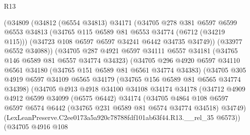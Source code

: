 \begin{lexlean}{R13}
\begin{coremodule}
                    (@34809
                      (@34812
                        (@6554 @34813)
                        @34171
                        (@34705
                          @278
                          @381
                          @6597
                          @6599
                          @6553
                          @34813
                          (@34765 @115 @6589 @81 @6553 @34774 (@6712 (@34219 @115)))
                          (@34723 @108 @6597 @6597 @34241 @6442 @34735 @34749))
                        (@33977 @6552 @34088))
                      (@34705
                        @287
                        @4921
                        @6597
                        @34111
                        @6557
                        @34181
                        (@34765 @146 @6589 @81 @6557 @34774 @34323)
                        (@34705
                          @296
                          @4920
                          @6597
                          @34110
                          @6561
                          @34180
                          (@34765 @151 @6589 @81 @6561 @34774 @34383)
                          (@34705
                            @305
                            @4919
                            @6597
                            @34109
                            @6565
                            @34179
                            (@34765 @156 @6589 @81 @6565 @34774 @34398)
                            (@34705
                              @4913
                              @4918
                              @34100
                              @34108
                              @34174
                              @34178
                              (@34712
                                @4909
                                @4912
                                @6599
                                @34099
                                (@6575 @6442)
                                @34174
                                (@34705
                                  @4864
                                  @108
                                  @6597
                                  @6597
                                  @6574
                                  @6442
                                  (@34765 @231 @6589 @81 @6574 @34774 @34518)
                                  @34749)
                                (LexLeanPreserve.C2ee0173a5a920c78788fdf101ab63f44.R13.__rel_35
                                  @6573))
                              (@34705
                                @4916
                                @108

\end{coremodule}
\end{lexlean}
